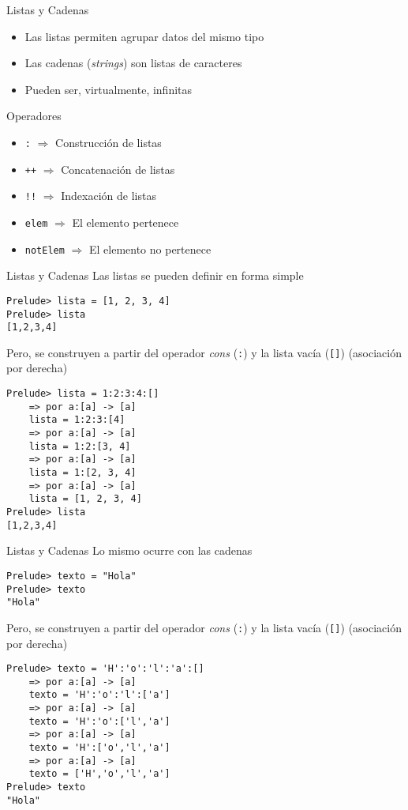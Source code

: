 \begin{frame}[fragile]{Listas y Cadenas}
    \begin{itemize}
        \item Las listas permiten agrupar datos del mismo tipo
        \item Las cadenas (\emph{strings}) son listas de caracteres
        \item Pueden ser, virtualmente, infinitas
    \end{itemize}
    \begin{block}{Operadores}
        \begin{itemize}
            \item \verb|:| $\Rightarrow$ Construcción de listas
            \item \verb|++| $\Rightarrow$ Concatenación de listas
            \item \verb|!!| $\Rightarrow$ Indexación de listas
            \item \verb|elem| $\Rightarrow$ El elemento pertenece
            \item \verb|notElem| $\Rightarrow$ El elemento no pertenece
        \end{itemize}    
    \end{block}
\end{frame}

\begin{frame}[fragile]{Listas y Cadenas}
    Las listas se pueden definir en forma simple
    \begin{lstlisting}[style=consola]
Prelude> lista = [1, 2, 3, 4]
Prelude> lista
[1,2,3,4]
    \end{lstlisting}
    Pero, se construyen a partir del operador \emph{cons} (\verb|:|) y la lista vacía (\verb|[]|) (asociación por derecha)
    \begin{lstlisting}[style=consola]
Prelude> lista = 1:2:3:4:[]
    => por a:[a] -> [a]
    lista = 1:2:3:[4]
    => por a:[a] -> [a]
    lista = 1:2:[3, 4]
    => por a:[a] -> [a]
    lista = 1:[2, 3, 4]
    => por a:[a] -> [a]
    lista = [1, 2, 3, 4]
Prelude> lista
[1,2,3,4]
    \end{lstlisting}
\end{frame}


\begin{frame}[fragile]{Listas y Cadenas}
    Lo mismo ocurre con las cadenas
    \begin{lstlisting}[style=consola]
Prelude> texto = "Hola"
Prelude> texto
"Hola"
    \end{lstlisting}
    Pero, se construyen a partir del operador \emph{cons} (\verb|:|) y la lista vacía (\verb|[]|) (asociación por derecha)
    \begin{lstlisting}[style=consola]
Prelude> texto = 'H':'o':'l':'a':[]
    => por a:[a] -> [a]
    texto = 'H':'o':'l':['a']
    => por a:[a] -> [a]
    texto = 'H':'o':['l','a']
    => por a:[a] -> [a]
    texto = 'H':['o','l','a']
    => por a:[a] -> [a]
    texto = ['H','o','l','a']
Prelude> texto
"Hola"
    \end{lstlisting}
\end{frame}



